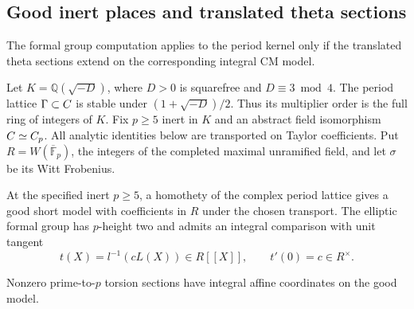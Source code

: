 \subsection{Good inert places and translated theta sections}
\label{subsec:cm-models}
\hypertarget{source-cm-models}{}

The formal group computation applies to the period kernel only if the translated theta sections extend on the corresponding integral CM model.

Let \(K=\mathbb Q(\sqrt{-D})\), where \(D>0\) is squarefree
and \(D\equiv3\bmod4\). The period lattice \(\Gamma\subset C\)
is stable under \((1+\sqrt{-D})/2\). Thus its multiplier order
is the full ring of integers of \(K\). Fix \(p\ge5\) inert in
\(K\) and an abstract field isomorphism \(C\simeq C_p\).
All analytic identities below are transported on Taylor
coefficients. Put \(R=W(\overline{\mathbb F}_p)\), the integers
of the completed maximal unramified field, and let \(\sigma\)
be its Witt Frobenius.

\begin{proposition}\label{prop:good-inert-cm-model}
At the specified inert \(p\ge5\), a homothety of the complex
period lattice gives a good short model with coefficients in \(R\)
under the chosen transport. The
elliptic formal group has \(p\)-height two and admits an integral comparison with unit tangent
\[
 t(X)=l^{-1}(cL(X))\in R[\![X]\!],\qquad t'(0)=c\in R^\times.
\]

Nonzero prime-to-\(p\) torsion sections have integral affine
coordinates on the good model.
\end{proposition}

